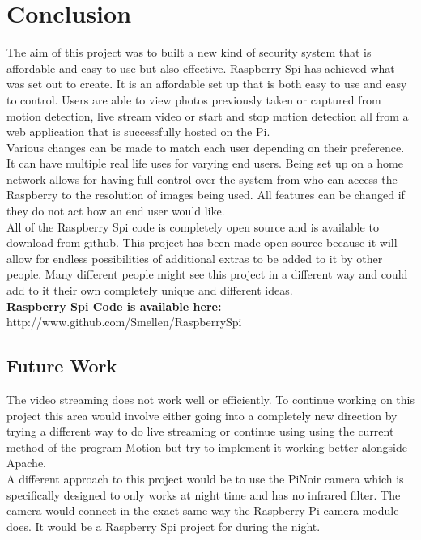 \documentclass[]{report}
\begin{document}
\chapter{Conclusion}
\label{ch:concl}
%
%
%
%
The aim of this project was to built a new kind of security system that is affordable and easy to use but also effective. Raspberry Spi has achieved what was set out to create. It is an affordable set up that is both easy to use and easy to control. Users are able to view photos previously taken or captured from motion detection, live stream video or start and stop motion detection all from a web application that is successfully hosted on the Pi. \\

Various changes can be made to match each user depending on their preference. It can have multiple real life uses for varying end users. Being set up on a home network allows for having full control over the system from who can access the Raspberry to the resolution of images being used. All features can be changed if they do not act how an end user would like.\\

All of the Raspberry Spi code is completely open source and is available to download from github. This project has been made open source because it will allow for endless possibilities of additional extras to be added to it by other people. Many different people might see this project in a different way and could add to it their own completely unique and different ideas.\\
\noindent
{\bf Raspberry Spi Code is available here:\\}
{http://www.github.com/Smellen/RaspberrySpi}




\section{Future Work}
\label{sec:future}

The video streaming does not work well or efficiently. To continue working on this project this area would involve either going into a completely new direction by trying a different way to do live streaming or continue using using the current method of the program Motion but try to implement it working better alongside Apache.\\

A different approach to this project would be to use the PiNoir camera which is specifically designed to only works at night time and has no infrared filter. The camera would connect in the exact same way the Raspberry Pi camera module does. It would be a Raspberry Spi project for during the night.\\
\end{document}
